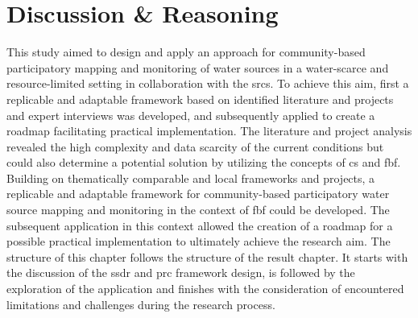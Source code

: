 \chapter{Discussion \& Reasoning}

\label{chapter5} 
This study aimed to design and apply an approach for community-based participatory mapping and monitoring of water sources in a water-scarce and resource-limited setting in collaboration with the \acrlong{srcs}. To achieve this aim, first a replicable and adaptable framework based on identified literature and projects and expert interviews was developed, and subsequently applied to create a roadmap facilitating practical implementation.\newline
The literature and project analysis revealed the high complexity and data scarcity of the current conditions but could also determine a potential solution by utilizing the concepts of \acrlong{cs} and \acrlong{fbf}. Building on thematically comparable and local frameworks and projects, a replicable and adaptable framework for community-based participatory water source mapping and monitoring in the context of \acrlong{fbf} could be developed. The subsequent application in this context allowed the creation of a roadmap for a possible practical implementation to ultimately achieve the research aim.\newline
The structure of this chapter follows the structure of the result chapter. It starts with the discussion of the \acrshort{ssdr} and \acrshort{prc} framework design, is followed by the exploration of the application and finishes with the consideration of encountered limitations and challenges during the research process.

